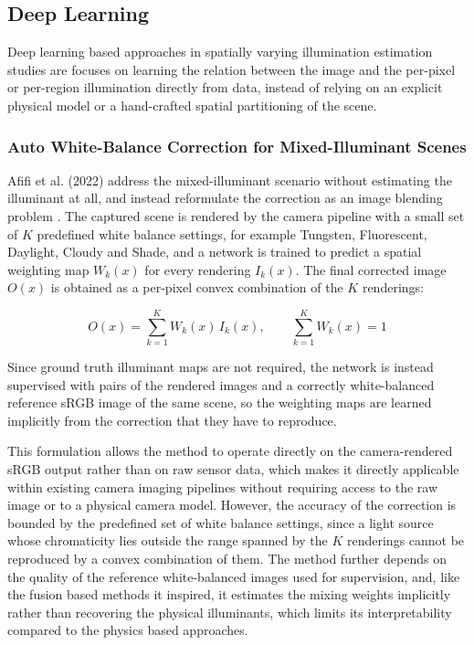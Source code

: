 \subsection{Deep Learning}
\label{sec:spatially_varying_deep_learning_approaches}

Deep learning based approaches in spatially varying illumination estimation studies are focuses on learning the relation between the image and the per-pixel or per-region illumination directly from data, instead of relying on an explicit physical model or a hand-crafted spatial partitioning of the scene.

\subsubsection{Auto White-Balance Correction for Mixed-Illuminant Scenes}

Afifi et al. (2022) address the mixed-illuminant scenario without estimating the illuminant at all, and instead reformulate the correction as an image blending problem \cite{afifi2022autoWB}. The captured scene is rendered by the camera pipeline with a small set of $K$ predefined white balance settings, for example Tungsten, Fluorescent, Daylight, Cloudy and Shade, and a network is trained to predict a spatial weighting map $W_k(x)$ for every rendering $I_k(x)$. The final corrected image $O(x)$ is obtained as a per-pixel convex combination of the $K$ renderings:

\begin{equation}
O(x) = \sum_{k=1}^{K} W_k(x) \, I_k(x), \qquad \sum_{k=1}^{K} W_k(x) = 1
\end{equation}

Since ground truth illuminant maps are not required, the network is instead supervised with pairs of the rendered images and a correctly white-balanced reference sRGB image of the same scene, so the weighting maps are learned implicitly from the correction that they have to reproduce.

This formulation allows the method to operate directly on the camera-rendered sRGB output rather than on raw sensor data, which makes it directly applicable within existing camera imaging pipelines without requiring access to the raw image or to a physical camera model. However, the accuracy of the correction is bounded by the predefined set of white balance settings, since a light source whose chromaticity lies outside the range spanned by the $K$ renderings cannot be reproduced by a convex combination of them. The method further depends on the quality of the reference white-balanced images used for supervision, and, like the fusion based methods it inspired, it estimates the mixing weights implicitly rather than recovering the physical illuminants, which limits its interpretability compared to the physics based approaches.

